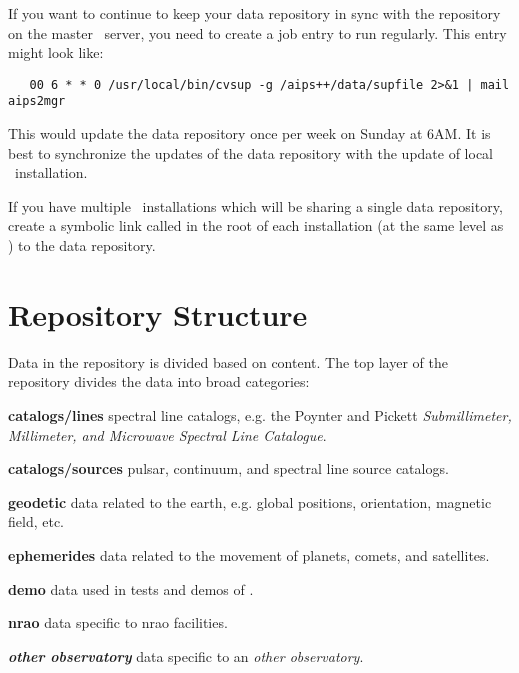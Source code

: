 If you want to continue to keep your data repository in sync with the repository
on the master \aipspp\ server, you need to create a  job entry to
run  regularly. This entry might look like:

\begin{verbatim}
   00 6 * * 0 /usr/local/bin/cvsup -g /aips++/data/supfile 2>&1 | mail aips2mgr
\end{verbatim}

\noindent
This would update the data repository once per week on Sunday at 6AM. It is
best to synchronize the updates of the data repository with the update of
local \aipspp\ installation.

If you have multiple \aipspp\ installations which will be sharing a single
data repository, create a symbolic link called  in the root of
each installation (at the same level as ) to the data repository.

\section{Repository Structure}
\label{data repository structure}

Data in the repository is divided based on content. The top layer of the
repository divides the data into broad categories:

\begin{list}{}{\setlength{\rightmargin}{\leftmargin}}

\item{\textbf{catalogs/lines}} spectral line catalogs, e.g. the Poynter and Pickett \textit{Submillimeter, Millimeter, and Microwave Spectral Line Catalogue}.

\item{\textbf{catalogs/sources}} pulsar, continuum, and spectral line source catalogs.

\item{\textbf{geodetic}} data related to the earth, e.g. global positions, orientation,
magnetic field, etc.

\item{\textbf{ephemerides}} data related to the movement of planets, comets, and satellites.

\item{\textbf{demo}} data used in tests and demos of \aipspp.

\item{\textbf{nrao}} data specific to nrao facilities.

\item{\textbf{\textit{other observatory}}} data specific to an \textit{other observatory}.

\end{list}

